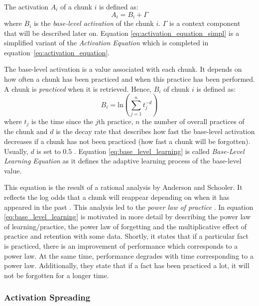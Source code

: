 The activation $A_i$ of a chunk $i$ is defined as:
\begin{equation}
 \label{eq:activation_equation_simpl}
 A_i = B_i + \Gamma
\end{equation}
where $B_i$ is the \emph{base-level activation} of the chunk $i$. $\Gamma$ is a context component that will be described later on. Equation \eqref{eq:activation_equation_simpl} is a simplified variant of the \emph{Activation Equation} which is completed in equation~\eqref{eq:activation_equation}. 

The base-level activation is a value associated with each chunk. It depends on how often a chunk has been practiced and when this practice has been performed. A chunk is \emph{practiced} when it is retrieved. Hence, $B_i$ of chunk $i$ is defined as:
\begin{equation}
\label{eq:base_level_learning}
B_i = \mathrm{ln}\left(\sum_{j=1}^n{t_j^{-d}}\right)
\end{equation}
where $t_j$ is the time since the $j$th practice, $n$ the number of overall practices of the chunk and $d$ is the decay rate that describes how fast the base-level activation decreases if a chunk has not been practiced (how fast a chunk will be forgotten). Usually, $d$ is set to $0.5$ \cite[p. 1042]{anderson_integrated_2004}. Equation \eqref{eq:base_level_learning} is called \emph{Base-Level Learning Equation} as it defines the adaptive learning process of the base-level value.

This equation is the result of a rational analysis by Anderson and Schooler. It reflects the log odds that a chunk will reappear depending on when it has appeared in the past \cite[33]{taatgen_modeling_2006}. This analysis led to the \emph{power law of practice} \cite[1042]{anderson_integrated_2004}. In \cite[8--11]{anderson_implications_2000} equation \eqref{eq:base_level_learning} is motivated in more detail by describing the power law of learning/practice, the power law of forgetting and the multiplicative effect of practice and retention with some data. Shortly, it states that if a particular fact is practiced, there is an improvement of performance which corresponds to a power law. At the same time, performance degrades with time corresponding to a power law. Additionally, they state that if a fact has been practiced a lot, it will not be forgotten for a longer time.

\subsubsection{Activation Spreading}

